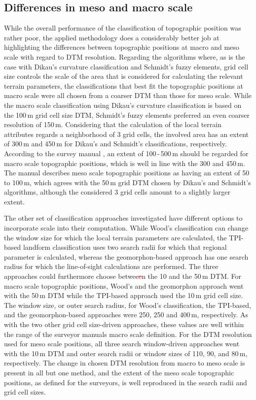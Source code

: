 \documentclass[preprint,12pt,authoryear]{elsarticle}
\begin{document}
\subsection{Differences in meso and macro scale}
While the overall performance of the classification of topographic position was rather poor, the applied methodology does a considerably better job at highlighting the differences between topographic positions at macro and meso scale with regard to DTM resolution.
Regarding the algorithms where, as is the case with Dikau's curvature classification and Schmidt's fuzzy elements, grid cell size controls the scale of the area that is considered for calculating the relevant terrain parameters, the classifications that best fit the topographic positions at macro scale were all chosen from a coarser DTM than those for meso scale. While the macro scale classification using Dikau's curvature classification is based on the 100\,m grid cell size DTM, Schmidt's fuzzy elements preferred an even coarser resolution of 150\,m. Considering that the calculation of the local terrain attributes regards a neighborhood of 3 grid cells, the involved area has an extent of 300\,m and 450\,m for Dikau's and Schmidt's classifications, respectively. According to the survey manual \citep{Englisch1998}, an extent of 100\,-\,500\,m should be regarded for macro scale topographic positions, which is well in line with the 300 and 450\,m. The manual describes meso scale topographic positions as having an extent of 50 to 100\,m, which agrees with the 50\,m grid DTM chosen by Dikau's and Schmidt's algorithms, although the considered 3 grid cells amount to a slightly larger extent.

The other set of classification approaches investigated have different options to incorporate scale into their computation. While Wood's classification can change the window size for which the local terrain parameters are calculated, the TPI-based landform classification uses two search radii for which that regional parameter is calculated, whereas the geomorphon-based approach has one search radius for which the line-of-sight calculations are performed. The three approaches could furthermore choose betwee\textcolor{red}{\sout{e}}n the 10 and the 50\,m DTM. For macro scale topographic positions, Wood's and the geomorphon approach went with the 50\,m DTM while the TPI-based approach used the 10\,m grid cell size. The window size, or outer search radius, for Wood's classification, the TPI-based, and the geomorphon-based approaches were 250, 250 and 400\,m, respectively. As with the two other grid cell size-driven approaches, these values are well within the range of the surveyor manuals macro scale definition. For the DTM resolution used for meso scale positions, all three search window-driven approaches went with the 10\,m DTM and outer search radii or window sizes of 110, 90, and 80\,m, respectively. The change in chosen DTM resolution from macro to meso scale is present in all but one method, and the extent of the meso scale topographic positions, as defined for the surveyors, is well reproduced in the search radii and grid cell sizes.
\end{document}
